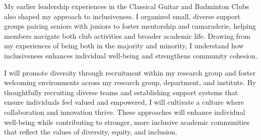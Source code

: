 \documentclass{article}
\begin{document}
My earlier leadership experiences in the Classical Guitar and Badminton Clubs also shaped my approach to inclusiveness. I organized small, diverse support groups pairing seniors with juniors to foster mentorship and camaraderie, helping members navigate both club activities and broader academic life. Drawing from my experiences of being both in the majority and minority, I understand how inclusiveness enhances individual well-being and strengthens community cohesion.

I will promote diversity through recruitment within my research group and foster welcoming environments across my research group, department, and institute. By thoughtfully recruiting diverse teams and establishing support systems that ensure individuals feel valued and empowered, I will cultivate a culture where collaboration and innovation thrive. These approaches will enhance individual well-being while contributing to stronger, more inclusive academic communities that reflect the values of diversity, equity, and inclusion.
\end{document}

